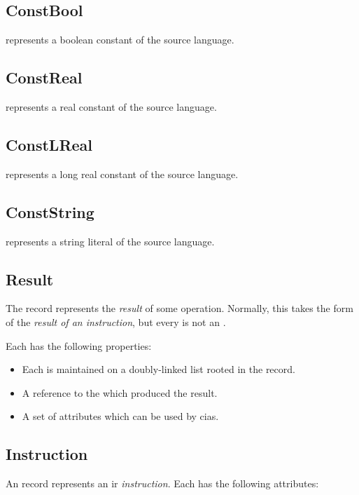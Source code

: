 \subsection{ConstBool}
 represents a boolean constant of the source language.
\subsection{ConstReal}
 represents a real constant of the source language.
\subsection{ConstLReal}
 represents a long real constant of the source language.
\subsection{ConstString}
 represents a string literal of the source language.

\subsection{Result}
The  record represents the \emph{result} of some
operation.  Normally, this takes the form of the \emph{result of an
  instruction}, but every  is not an .

Each  has the following properties:

\begin{itemize}
\item Each is maintained on a doubly-linked list rooted in the
   record.

\item A reference to the  which produced the result.

\item A set of attributes which can be used by \acp{cia}.
\end{itemize}

\subsection{Instruction}

An  record represents an \ac{ir} \emph{instruction}.
Each  has the following attributes:

